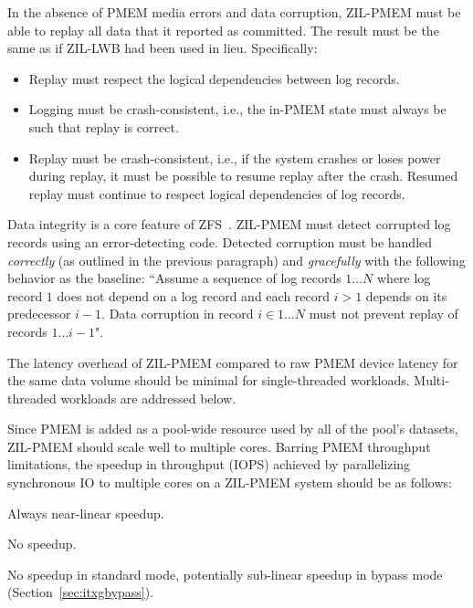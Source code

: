 \documentclass[12pt,a4paper,twoside]{book}
\begin{document}
In the absence of PMEM media errors and data corruption, ZIL-PMEM must be able to replay all data that it reported as committed.
The result must be the same as if ZIL-LWB had been used in lieu.
Specifically:
\begin{itemize}[noitemsep,beginpenalty=100000,midpenalty=100000]
    \item Replay must respect the logical dependencies between log records.
    \item Logging must be crash-consistent, i.e., the in-PMEM state must always be such that replay is correct.
    \item Replay must be crash-consistent, i.e., if the system crashes or loses power during replay, it must be possible to resume replay after the crash.
        Resumed replay must continue to respect logical dependencies of log records.
\end{itemize}

Data integrity is a core feature of ZFS~\cite{bonwickZettabyteFileSystem2003}.
ZIL-PMEM must detect corrupted log records using an error-detecting code.
Detected corruption must be handled \textit{correctly} (as outlined in the previous paragraph) and \textit{gracefully} with the following behavior as the baseline:
``Assume a sequence of log records $1 \dots N$ where log record $1$ does not depend on a log record and each record $i > 1$ depends on its predecessor $i-1$.
Data corruption in record $i \in 1 \dots N$ must not prevent replay of records $1 \dots i-1$".

The latency overhead of ZIL-PMEM compared to raw PMEM device latency for the same data volume should be minimal for single-threaded workloads.
Multi-threaded workloads are addressed below.

Since PMEM is added as a pool-wide resource used by all of the pool's datasets, ZIL-PMEM should scale well to multiple cores.
Barring PMEM throughput limitations, the speedup in throughput (IOPS) achieved by parallelizing synchronous IO to multiple cores on a ZIL-PMEM system should be as follows:
{
\setlength{\parskip}{0pt}
\begin{description}[topsep=0pt, noitemsep, leftmargin=1cm, labelindent=1cm, widest=1 private dataset per thread]
    \item[1 private dataset per thread] Always near-linear speedup.
    \item[1 shared dataset] \mbox{}
          \begin{description}[noitemsep, leftmargin=1cm, labelindent=1cm, widest=ZPL filesystem]
              \item[ZPL filesystem] No speedup.
              \item[ZVOL] No speedup in standard mode, potentially sub-linear speedup in bypass mode (Section~\ref{sec:itxgbypass}).
          \end{description}
\end{description}
}
\end{document}
